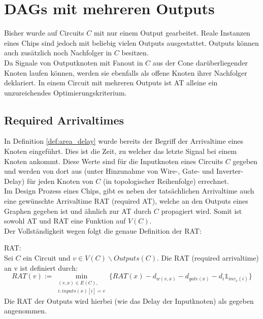 \documentclass[11pt, a4paper, german]{article}
\begin{document}
\section{DAGs mit mehreren Outputs}
\label{sec:outputs}
Bisher wurde auf Circuits $C$ mit nur einem Output gearbeitet. Reale Instanzen eines Chips sind jedoch mit beliebig vielen Outputs ausgestattet. Outputs können auch zusätzlich noch Nachfolger in $C$ besitzen. \\

 Da Signale von Outputknoten mit Fanout in $C$ aus der Cone darüberliegender Knoten laufen können, werden sie ebenfalls als offene Knoten ihrer Nachfolger deklariert. In einem Circuit mit mehreren Outputs ist AT alleine ein unzureichendes Optimierungskriterium.
\subsection{Required Arrivaltimes}
\label{subsec:rat}
In Definition \ref{def:area_delay} wurde bereits der Begriff der Arrivaltime eines Knoten eingeführt. Dies ist die Zeit, zu welcher das letzte Signal bei einem Knoten ankommt. Diese Werte sind für die Inputknoten eines Circuits $C$ gegeben und werden von dort aus (unter Hinzunahme von Wire-, Gate- und Inverter-Delay) für jeden Knoten von $C$ (in topologischer Reihenfolge) errechnet.\\
Im Design Prozess eines Chips, gibt es neben der tatsächlichen Arrivaltime auch eine  gewünschte Arrivaltime RAT (required AT), welche an den Outputs eines Graphen gegeben ist und ähnlich zur AT durch $C$ propagiert wird. Somit ist sowohl AT und RAT eine Funktion auf $V(C)$. \\
Der Vollständigkeit wegen folgt die genaue Definition der RAT:\\

\begin{definition}{RAT:}\\
	Sei $C$ ein Circuit und $v \in V(C)\backslash  Outputs(C)$. Die RAT (required arrivaltime) an v ist definiert durch:
	\[   RAT(v) := \min\limits_{ \substack{(v,x)\in E(C), \\ i: inputs(x)[i] = v }} \{ RAT(x) - d_{w(v,x)} - d_{gate(x)} - d_{i} \mathbb{1}_{inv_x(i)} \}\] 
	Die RAT der Outputs wird hierbei (wie das Delay der Inputknoten) als gegeben angenommen. 
\end{definition}
\end{document}
